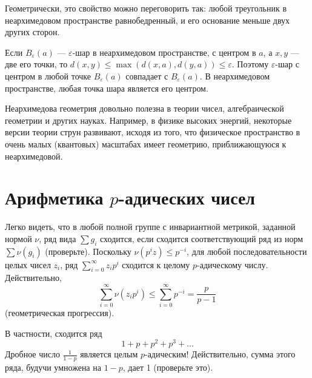 \documentclass[12pt]{book}
\renewcommand{\epsilon}{\varepsilon}
\theoremstyle{upshape}
\theoremstyle{generic}
\theoremstyle{upshapenonumber}
\newcommand{\следствие}{%
     \refstepcounter{teorema}
     {\noindent\bf Следствие \thechapter.\arabic{teorema}:\ }}
\newcommand{\пример}{%
     \refstepcounter{teorema}
     {\noindent\bf Пример \thechapter.\arabic{teorema}:\ }}
\newcommand{\лемма}{%
     \refstepcounter{teorema}
     {\noindent\bf Лемма \thechapter.\arabic{teorema}:\ }}
\newcommand{\теорема}{%
     \refstepcounter{teorema}
     {\noindent\bf Теорема \thechapter.\arabic{teorema}:\ }}
\newcommand{\утверждение}{%
     \refstepcounter{teorema}
     {\noindent\bf Утверждение \thechapter.\arabic{teorema}:\ }}
\begin{document}
Геометрически, это свойство можно
переговорить так: любой треугольник в неархимедовом пространстве
равнобедренный, и его основание меньше 
двух других сторон.

Если $B_\epsilon(a)$ --- $\epsilon$-шар в неархимедовом
пространстве, с центром в $a$, а $x, y$ --- две его точки,
то $d(x,y) \leq \max( d(x,a), d(y, a)) \leq \epsilon$.
Поэтому $\epsilon$-шар с центром в любой точке
$B_\epsilon(a)$ совпадает с $B_\epsilon(a)$.
В неархимедовом пространстве, любая точка
шара является его центром.

Неархимедова геометрия довольно полезна в теории чисел,
алгебраической геометрии и других науках. 
Например, в физике высоких энергий, некоторые версии
теории струн развивают, исходя из того, что
физическое пространство в очень малых (квантовых) 
масштабах имеет геометрию, приближающуюся
к неархимедовой. 


\section{Арифметика $p$-адических чисел}



Легко видеть, что в любой полной группе с инвариантной
метрикой, заданной нормой $\nu$, ряд вида $\sum g_i$ 
сходится, если сходится соответствующий ряд из норм 
$\sum\nu(g_i)$ (проверьте). Поскольку
$\nu(p^i z) \leq p^{-i}$, для любой последовательности
целых чисел $z_i$, ряд $\sum_{i=0}^\infty z_i p^{i}$
сходится к целому $p$-адическому числу. Действительно,
\[
\sum _{i=0}^\infty \nu(z_i p^{i}) \leq \sum _{i=0}^\infty
p^{-i} = \frac {p}{p-1}
\]
(геометрическая прогрессия).

В частности, сходится ряд
\[
1 + p + p^2 + p^3 + ...
\]
Дробное число $\frac {1}{1-p}$ является целым
$p$-адическим! Действительно, сумма этого ряда,
будучи умножена на $1-p$, дает 1 (проверьте это).
\end{document}
